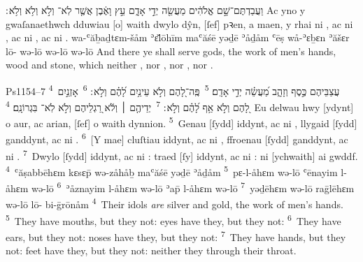 \begin{example}{5}{4}{28}{}{}
	\quoling
	{וַעֲבַדְתֶּם־שָׁ֣ם אֱלֹהִ֔ים מַעֲשֵׂ֖ה יְדֵ֣י אָדָ֑ם עֵ֣ץ וָאֶ֔בֶן אֲשֶׁ֤ר לֹֽא־ וְלֹ֣א  וְלֹ֥א  וְלֹ֥א ׃}
	{Ac yno y gwaſanaethwch dduwiau [o] waith dwylo dŷn, [ſef] pꝛen, a maen, y rhai ni , ac ni , ac ni , ac ni .}
	{wa-ʿăḇaḏtɛm-šåm ʾɛ̆lōhīm maʿăśē yəḏē ʾåḏåm ʿēṣ wå-ʾɛḇɛn ʾăšɛr lō- wə-lō  wə-lō  wə-lō }
	{And there ye shall serve gods, the work of men’s hands, wood and stone, which neither , nor , nor , nor .}
\end{example}

\begin{example}{Ps}{115}{4–7}{}{}
	\quoling
	{%
		\textsuperscript{4}~עֲצַבֵּיהֶם כֶּ֣סֶף וְזָהָ֑ב מַ֝עֲשֵׂ֗ה יְדֵ֣י אָדָֽם׃
		\textsuperscript{5}~פֶּֽה־לָ֭הֶם וְלֹ֣א  עֵינַ֥יִם לָ֝הֶ֗ם וְלֹ֣א ׃
		\textsuperscript{6}~אָזְנַ֣יִם לָ֭הֶם וְלֹ֣א  אַ֥ף לָ֝הֶ֗ם וְלֹ֣א ׃
		\textsuperscript{7}~יְדֵיהֶ֤ם ׀ וְלֹ֬א  רַ֭גְלֵיהֶם וְלֹ֣א  לֹֽא־ בִּגְרוֹנָֽם׃
	}
	{%
		\textsuperscript{4}~Eu delwau hwy [ydynt] o aur, ac arian, [ſef] o waith dynnion.
		\textsuperscript{5}~Genau [ſydd] iddynt, ac ni , llygaid [ſydd] ganddynt, ac ni .
		\textsuperscript{6}~[Y mae] cluſtiau iddynt, ac ni , ffroenau [ſydd] ganddynt, ac ni .
		\textsuperscript{7}~Dwylo [ſydd] iddynt, ac ni : traed [ſy] iddynt, ac ni : ni  [ychwaith] ai gwddf.
	}
	{%
		\textsuperscript{4}~ʿăṣabbēhɛm kɛsɛp̄ wə-zåhåḇ maʿăśē yəḏē ʾåḏåm
		\textsuperscript{5}~pɛ-l-åhɛm wə-lō  ʿēnayim l-åhɛm wə-lō 
		\textsuperscript{6}~ʾåznayim l-åhɛm wə-lō  ʾap̄ l-åhɛm wə-lō 
		\textsuperscript{7}~yəḏēhɛm wə-lō  raḡlēhɛm wə-lō lō- bi-ḡrōnåm
	}
	{%
		\textsuperscript{4}~Their idols \textit{are} silver and gold, the work of men’s hands.
		\textsuperscript{5}~They have mouths, but they  not: eyes have they, but they  not:
		\textsuperscript{6}~They have ears, but they  not: noses have they, but they  not:
		\textsuperscript{7}~They have hands, but they  not: feet have they, but they  not: neither  they through their throat.
	}
\end{example}



